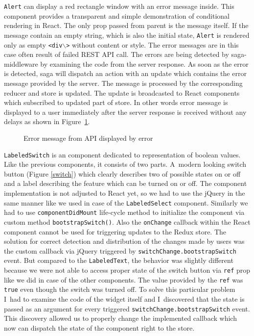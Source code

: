\texttt{Alert} can display a red rectangle window with an error message inside. This component provides a transparent and simple demonstration of conditional rendering in React. The only prop passed from parent is the message itself. If the message contain an empty string, which is also the initial state, \texttt{Alert} is rendered only as empty \texttt{<div$\backslash$>} without content or style. 
The error messages are in this case often result of failed REST API call. The errors are being detected by saga-middleware by examining the code from the server response. As soon as the error is detected, saga will dispatch an action with an update which contains the error message provided by the server. The message is processed by the corresponding reducer and store is updated. The update is broadcasted to React components which subscribed to updated part of store. In other words error message is displayed to a user immediately after the server response is received without any delays as shown in Figure~\ref{alert}.

\begin{figure}[h]
\caption{Error message from API displayed by error}
\label{alert}
\end{figure}

\texttt{LabeledSwitch} is an component dedicated to representation of boolean values. Like the previous components, it consists of two parts. A~modern looking switch button (Figure \ref{switch}) which clearly describes two of possible states on or off and a label describing the feature which can be turned on or off. The component implementation is not adjusted to React yet, so we had to use the jQuery in the same manner like we used in case of the \texttt{LabeledSelect} component. Similarly we had to use \texttt{componentDidMount} life-cycle method to initialize the component via custom method \texttt{bootstrapSwitch()}. Also the \texttt{onChange} callback within the React component cannot be used for triggering updates to the Redux store. The solution for correct detection and distribution of the changes made by users was the custom callback via jQuery triggered by \texttt{switchChange.bootstrapSwitch} event. But compared to the \texttt{LabeledText}, the behavior was slightly different because we were not able to access proper state of the switch button via \texttt{ref} prop like we did in case of the other components. The value provided by the \texttt{ref} was \texttt{true} even though the switch was turned off. To solve this particular problem I~had to examine the code of the widget itself and I~discovered that the state is passed as an argument for every triggered \texttt{switchChange.bootstrapSwitch} event. This discovery allowed us to properly change the implemented callback which now can dispatch the state of the component right to the store.

